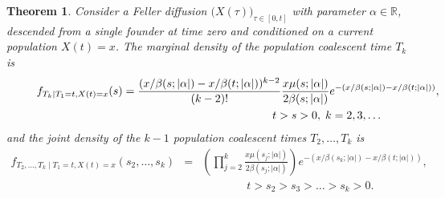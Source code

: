 \documentclass[preprint,12pt]{elsarticle}
\newtheorem{theorem}{Theorem}
\begin{document}
\begin{theorem}	\label{theorem:jointCoalescentDistrib}
Consider a Feller diffusion $\big(X(\tau)\big)_{\tau \in [0, t]}$ with parameter $\alpha \in \mathbb{R}$, 
descended from a single founder at time zero and conditioned on a current population $X(t) = x$. 
The marginal density of the population coalescent time $T_k$ is 
\begin{eqnarray}	\label{densityTkGivenx}
\lefteqn{f_{T_k \mid T_1 = t, X(t) = x}(s) = \frac{(x/\beta(s; |\alpha|) - x/\beta(t; |\alpha|))^{k - 2}}{(k - 2)!} \frac{x \mu(s; |\alpha|)}{2\beta(s; |\alpha|)} e^{-(x/\beta(s; |\alpha|) - x/\beta(t; |\alpha|))},} \qquad\qquad\qquad\nonumber \\
					& & \qquad\qquad\qquad\qquad\qquad\qquad\qquad t > s > 0,\; k = 2, 3, \ldots
\end{eqnarray}
and the joint density of the $k - 1$ population coalescent times $T_2, \ldots, T_k$ is 
\begin{eqnarray}	\label{jointTkGivenx}
f_{T_2, \ldots, T_k \mid T_1 = t, X(t) = x}(s_2, \ldots, s_k) & = & \left(\prod_{j = 2}^k \frac{x \mu(s_j; |\alpha|)}{2\beta(s_j; |\alpha|)} \right) 
									e^{-(x/\beta(s_k; |\alpha|) - x/\beta(t; |\alpha|))}, \nonumber \\
	&  & \qquad\qquad t > s_2 > s_3 > \ldots > s_k > 0. 
\end{eqnarray}
\end{theorem}
%
\end{document}
